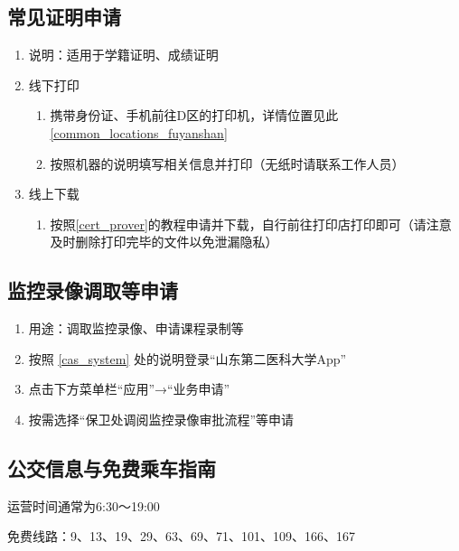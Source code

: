 \subsection[常见证明申请]{常见证明申请}
\begin{enumerate}
    \item 说明：适用于学籍证明\footnotemark、成绩证明
    \item 线下打印
          \begin{enumerate}
              \item 携带身份证、手机前往D区的打印机，详情位置见此\uline{\ref{common_locations_fuyanshan}}
              \item 按照机器的说明填写相关信息并打印（无纸时请联系工作人员）
          \end{enumerate}
    \item 线上下载
          \begin{enumerate}
              \item 按照\uline{\ref{cert_prover}}的教程申请并下载，自行前往打印店打印即可（请注意及时删除打印完毕的文件以免泄漏隐私）
          \end{enumerate}
\end{enumerate}

\subsection[监控录像调取等申请]{监控录像调取等申请}
\label{sdsmu_app}
\begin{enumerate}
    \item 用途：调取监控录像、申请课程录制等
    \item 按照 \uline{\ref{cas_system}} 处的说明登录“山东第二医科大学App”
    \item 点击下方菜单栏“应用”→“业务申请”
    \item 按需选择“保卫处调阅监控录像审批流程”等申请
\end{enumerate}

\subsection[公交信息与免费乘车指南]{公交信息与免费乘车指南}
\label{free_bus}
运营时间通常为6:30～19:00

免费线路\footnotemark：9、13、19、29、63、69、71、101、109、166、167

